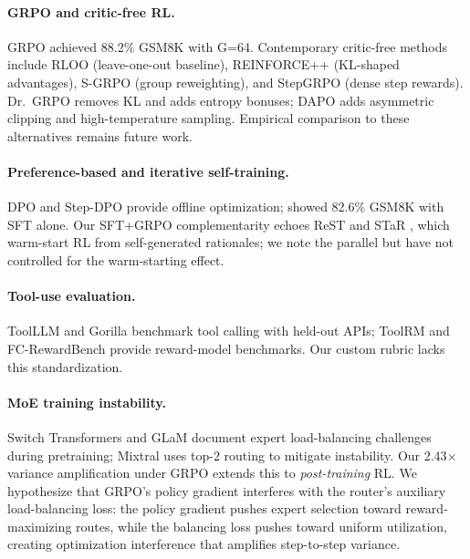 \documentclass{article}
\begin{document}
\paragraph{GRPO and critic-free RL.}
GRPO \citep{shao2024deepseekmath} achieved 88.2\% GSM8K with G=64. Contemporary critic-free methods include RLOO \citep{ahmadian2024backtobasics} (leave-one-out baseline), REINFORCE++ \citep{hu2025reinforceplusplus} (KL-shaped advantages), S-GRPO \citep{shen2025sgrpo} (group reweighting), and StepGRPO \citep{huang2025stepgrpo} (dense step rewards). Dr.\ GRPO \citep{deepseekr1} removes KL and adds entropy bonuses; DAPO \citep{yu2025dapo} adds asymmetric clipping and high-temperature sampling. Empirical comparison to these alternatives remains future work.

\paragraph{Preference-based and iterative self-training.}
DPO \citep{rafailov2024dpo} and Step-DPO \citep{lai2024stepdpo} provide offline optimization; \citet{li2024common7b} showed 82.6\% GSM8K with SFT alone. Our SFT+GRPO complementarity echoes ReST \citep{gulcehre2023rest} and STaR \citep{zelikman2022star}, which warm-start RL from self-generated rationales; we note the parallel but have not controlled for the warm-starting effect.

\paragraph{Tool-use evaluation.}
ToolLLM \citep{qin2024toolllm} and Gorilla \citep{patil2023gorilla} benchmark tool calling with held-out APIs; ToolRM \citep{wang2025toolrm} and FC-RewardBench \citep{chen2025fcrewardbench} provide reward-model benchmarks. Our custom rubric lacks this standardization.

\paragraph{MoE training instability.}
Switch Transformers \citep{fedus2022switch} and GLaM \citep{du2022glam} document expert load-balancing challenges during pretraining; Mixtral \citep{jiang2024mixtral} uses top-2 routing to mitigate instability. Our 2.43$\times$ variance amplification under GRPO extends this to \emph{post-training} RL. We hypothesize that GRPO's policy gradient interferes with the router's auxiliary load-balancing loss: the policy gradient pushes expert selection toward reward-maximizing routes, while the balancing loss pushes toward uniform utilization, creating optimization interference that amplifies step-to-step variance.
\end{document}
